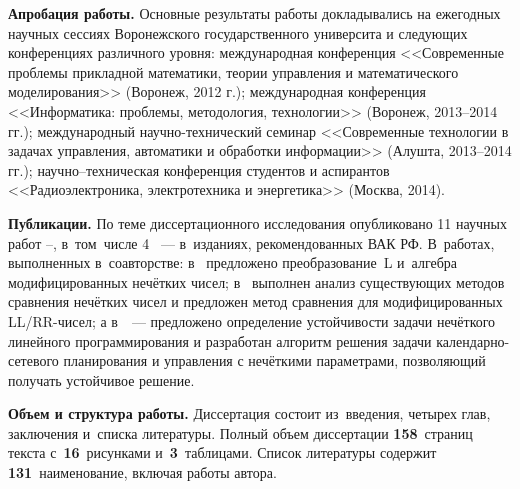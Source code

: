 \textbf{Апробация работы.} Основные результаты работы докладывались на ежегодных научных сессиях Воронежского государственного университа и следующих конференциях различного уровня: международная конференция <<Современные проблемы прикладной математики, теории управления и математического моделирования>> (Воронеж, 2012 г.); международная конференция <<Информатика: проблемы, методология, технологии>> (Воронеж, 2013--2014 гг.); международный научно-технический семинар <<Современные технологии в задачах управления, автоматики и обработки информации>> (Алушта, 2013--2014 гг.); научно--техническая конференция студентов и аспирантов <<Радиоэлектроника, электротехника и энергетика>> (Москва, 2014).

\textbf{Публикации.} По теме диссертационного исследования опубликовано 11 научных работ \cite{PMTYMM}--\cite{Kanischeva}, в~том~числе 4 \cite{Kanischeva, Vorontsov_Compare, Vorontsov_PI, Vorontsov_VSTU}~--- в~изданиях, рекомендованных ВАК РФ. В~работах, выполненных в~соавторстве: в~\cite{Vorontsov_PI} предложено преобразование~L и~алгебра модифицированных нечётких чисел; в~\cite{Vorontsov_Compare} выполнен анализ существующих методов сравнения нечётких чисел и предложен метод сравнения для модифицированных LL/RR-чисел; а в~\cite{Vorontsov_VSTU}~--- предложено определение устойчивости задачи нечёткого линейного программирования и разработан алгоритм решения задачи календарно-сетевого планирования и управления с нечёткими параметрами, позволяющий получать устойчивое решение.

\textbf{Объем и структура работы.} Диссертация состоит из~введения, четырех глав, заключения и~списка литературы. Полный объем диссертации \textbf{158}~страниц текста с~\textbf{16}~рисунками и~\textbf{3}~таблицами. Список литературы содержит \textbf{131}~наименование, включая работы автора.